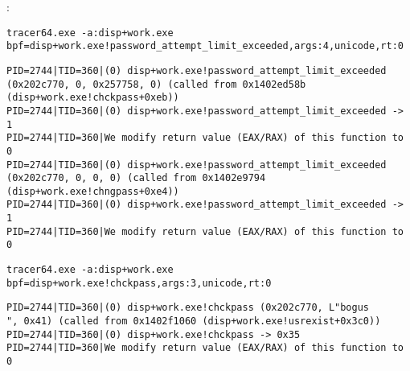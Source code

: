 :

\begin{lstlisting}
tracer64.exe -a:disp+work.exe bpf=disp+work.exe!password_attempt_limit_exceeded,args:4,unicode,rt:0
\end{lstlisting}

\begin{lstlisting}
PID=2744|TID=360|(0) disp+work.exe!password_attempt_limit_exceeded (0x202c770, 0, 0x257758, 0) (called from 0x1402ed58b (disp+work.exe!chckpass+0xeb))
PID=2744|TID=360|(0) disp+work.exe!password_attempt_limit_exceeded -> 1
PID=2744|TID=360|We modify return value (EAX/RAX) of this function to 0
PID=2744|TID=360|(0) disp+work.exe!password_attempt_limit_exceeded (0x202c770, 0, 0, 0) (called from 0x1402e9794 (disp+work.exe!chngpass+0xe4))
PID=2744|TID=360|(0) disp+work.exe!password_attempt_limit_exceeded -> 1
PID=2744|TID=360|We modify return value (EAX/RAX) of this function to 0
\end{lstlisting}



\begin{lstlisting}
tracer64.exe -a:disp+work.exe bpf=disp+work.exe!chckpass,args:3,unicode,rt:0
\end{lstlisting}

\begin{lstlisting}
PID=2744|TID=360|(0) disp+work.exe!chckpass (0x202c770, L"bogus                                   ", 0x41) (called from 0x1402f1060 (disp+work.exe!usrexist+0x3c0))
PID=2744|TID=360|(0) disp+work.exe!chckpass -> 0x35
PID=2744|TID=360|We modify return value (EAX/RAX) of this function to 0
\end{lstlisting}


